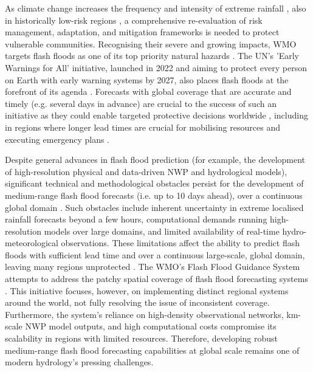 As  climate change increases the frequency and intensity of extreme rainfall \citep{WMO2024, IPCC2023}, also in historically low-risk regions \citep{Fowler2021}, a comprehensive re-evaluation of risk management, adaptation, and mitigation frameworks is needed to protect vulnerable communities. Recognising their severe and growing impacts, WMO targets flash floods as one of its top priority natural hazards \citep{WMO2024a}. The UN's 'Early Warnings for All' initiative, launched in 2022 and aiming to protect every person on Earth with early warning systems by 2027, also places flash floods at the forefront of its agenda \citep{UN2022}. Forecasts with global coverage that are accurate and timely (e.g. several days in advance) are crucial to the success of such an initiative as they could enable targeted protective decisions worldwide \citep{Merz2020}, including in regions where longer lead times are crucial for mobilising resources and executing emergency plans \citep{Bazo2019}. 

Despite  general advances in flash flood prediction (for example, the development of high-resolution physical and data-driven NWP and hydrological models), significant technical and methodological obstacles persist for the development of medium-range flash flood forecasts (i.e. up to 10 days ahead), over a continuous global domain \citep{Zanchetta2020}. Such obstacles include inherent uncertainty in extreme localised rainfall forecasts beyond a few hours, computational demands running high-resolution models over large domains, and limited availability of real-time hydro-meteorological observations. These limitations affect the ability to predict flash floods with sufficient lead time and over a continuous large-scale, global domain, leaving many regions unprotected \citep{AlRawas2024}. The WMO's Flash Flood Guidance System attempts to address the patchy spatial coverage of flash flood forecasting systems \citep{Georgakakos2021}. This initiative focuses, however, on implementing distinct regional systems around the world, not fully resolving the issue of inconsistent coverage. Furthermore, the system's reliance on high-density observational networks, km-scale NWP model outputs, and high computational costs compromise its scalability in regions with limited resources. Therefore, developing robust medium-range flash flood forecasting capabilities at global scale remains one of modern hydrology's pressing challenges.

